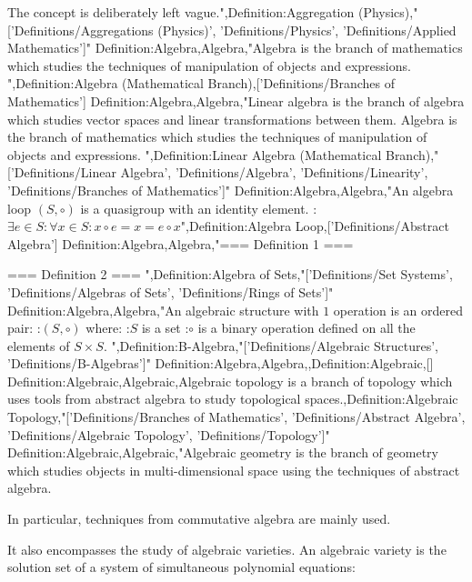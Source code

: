 The concept is deliberately left vague.",Definition:Aggregation (Physics),"['Definitions/Aggregations (Physics)', 'Definitions/Physics', 'Definitions/Applied Mathematics']"
Definition:Algebra,Algebra,"Algebra is the branch of mathematics which studies the techniques of manipulation of objects and expressions.
",Definition:Algebra (Mathematical Branch),['Definitions/Branches of Mathematics']
Definition:Algebra,Algebra,"Linear algebra is the branch of algebra which studies vector spaces and linear transformations between them.
Algebra is the branch of mathematics which studies the techniques of manipulation of objects and expressions.
",Definition:Linear Algebra (Mathematical Branch),"['Definitions/Linear Algebra', 'Definitions/Algebra', 'Definitions/Linearity', 'Definitions/Branches of Mathematics']"
Definition:Algebra,Algebra,"An algebra loop $\left( S, \circ \right)$ is a quasigroup with an identity element.
:$\exists e \in S: \forall x \in S: x \circ e = x = e \circ x$",Definition:Algebra Loop,['Definitions/Abstract Algebra']
Definition:Algebra,Algebra,"=== Definition 1 ===



=== Definition 2 ===
",Definition:Algebra of Sets,"['Definitions/Set Systems', 'Definitions/Algebras of Sets', 'Definitions/Rings of Sets']"
Definition:Algebra,Algebra,"An algebraic structure with $1$ operation is an ordered pair:
:$\left( S, \circ \right)$
where:
:$S$ is a set
:$\circ$ is a binary operation defined on all the elements of $S \times S$.
",Definition:B-Algebra,"['Definitions/Algebraic Structures', 'Definitions/B-Algebras']"
Definition:Algebra,Algebra,,Definition:Algebraic,[]
Definition:Algebraic,Algebraic,Algebraic topology is a branch of topology which uses tools from abstract algebra to study topological spaces.,Definition:Algebraic Topology,"['Definitions/Branches of Mathematics', 'Definitions/Abstract Algebra', 'Definitions/Algebraic Topology', 'Definitions/Topology']"
Definition:Algebraic,Algebraic,"Algebraic geometry is the branch of geometry which studies objects in multi-dimensional space using the techniques of abstract algebra.

In particular, techniques from commutative algebra are mainly used.

It also encompasses the study of algebraic varieties.
An algebraic variety is the solution set of a system of simultaneous polynomial equations:







